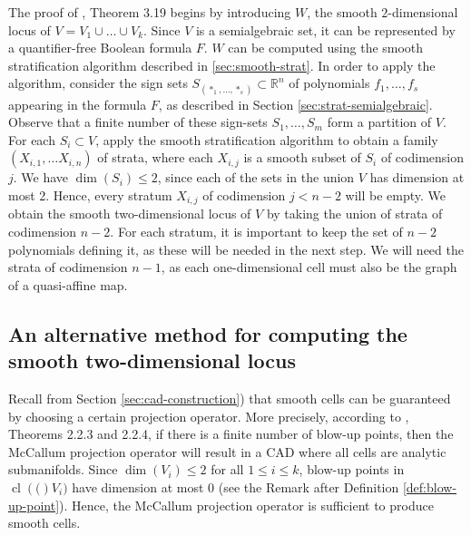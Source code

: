 \documentclass[
]{book}
\theoremstyle{definition}
\theoremstyle{definition}
\theoremstyle{definition}
\theoremstyle{definition}
\theoremstyle{remark}
\begin{document}
The proof of \citet{bgv15}, Theorem 3.19 begins by introducing \(W\), the smooth \(2\)-dimensional locus of \(V = V_1 \cup \ldots \cup V_k\).
Since \(V\) is a semialgebraic set, it can be represented by a quantifier-free Boolean formula \(F\).
\(W\) can be computed using the smooth stratification algorithm described in \ref{sec:smooth-strat}.
In order to apply the algorithm, consider the sign sets \(S_{(\ast_1,\ldots,\ast_s)} \subset \mathbb{R}^n\) of polynomials \(f_1,\ldots,f_s\) appearing in the formula \(F\), as described in Section \ref{sec:strat-semialgebraic}. Observe that a finite number of these sign-sets \(S_1,\ldots,S_m\) form a partition of \(V\).
For each \(S_i \subset V\), apply the smooth stratification algorithm to obtain a family \((X_{i,1}, \ldots X_{i,n})\) of strata, where each \(X_{i,j}\) is a smooth subset of \(S_i\) of codimension \(j\).
We have \(\dim(S_i) \le 2\), since each of the sets in the union \(V\) has dimension at most 2. Hence, every stratum \(X_{i,j}\) of codimension \(j < n-2\) will be empty.
We obtain the smooth two-dimensional locus of \(V\) by taking the union of strata of codimension \(n-2\). For each stratum, it is important to keep the set of \(n-2\) polynomials defining it, as these will be needed in the next step. We will need the strata of codimension \(n-1\), as each one-dimensional cell must also be the graph of a quasi-affine map.

\hypertarget{an-alternative-method-for-computing-the-smooth-two-dimensional-locus}{%
\subsection{An alternative method for computing the smooth two-dimensional locus}\label{an-alternative-method-for-computing-the-smooth-two-dimensional-locus}}

Recall from Section \ref{sec:cad-construction}) that smooth cells can be guaranteed by choosing a certain projection operator.
More precisely, according to \citet{mccallum1988}, Theorems 2.2.3 and 2.2.4, if there is a finite number of blow-up points, then the McCallum projection operator will result in a CAD where all cells are analytic submanifolds.
Since \(\dim(V_i) \le 2\) for all \(1 \le i \le k\), blow-up points in \({\operatorname{cl} \left( ( \right)}V_i)\) have dimension at most \(0\) (see the Remark after Definition \ref{def:blow-up-point}).
Hence, the McCallum projection operator is sufficient to produce smooth cells.
\end{document}
